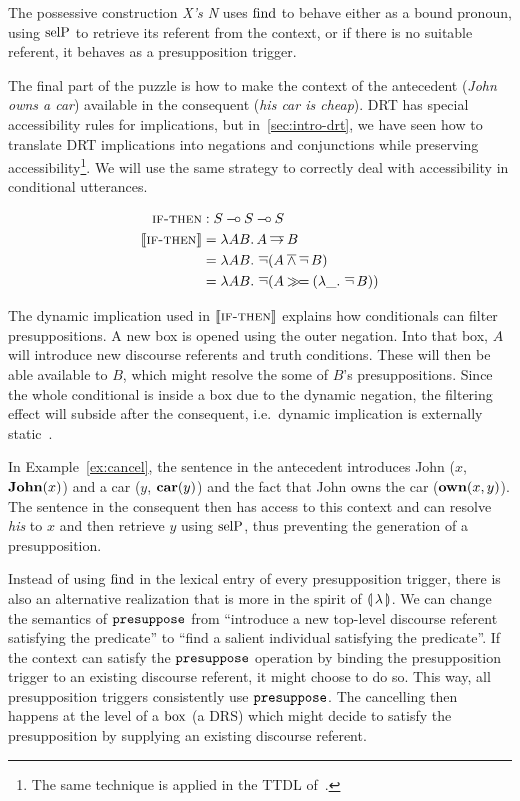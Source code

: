The possessive construction \emph{X's N} uses $\operatorname{find}$ to behave either as a
bound pronoun, using $\operatorname{selP}$ to retrieve its referent from the context, or
if there is no suitable referent, it behaves as a presupposition trigger.

The final part of the puzzle is how to make the context of the antecedent
(\emph{John owns a car}) available in the consequent (\emph{his car is
  cheap}). DRT has special accessibility rules for implications, but
in~\ref{sec:intro-drt}, we have seen how to translate DRT implications into
negations and conjunctions while preserving accessibility\footnote{The same
  technique is applied in the TTDL of~\cite{lebedeva2012expression}.}. We
will use the same strategy to correctly deal with accessibility in
conditional utterances.

\begin{align*}
  \textsc{if-then} &: S \mathbin{{-}\mkern-3.5mu{\circ}} S \mathbin{{-}\mkern-3.5mu{\circ}} S \\
  \llbracket \textsc{if-then} \rrbracket &= \lambda A B.\, A \mathbin{\overline{\to}} B \\
  &= \lambda A B.\, \mathop{\overline{\lnot}} (A \mathbin{\overline{\land}} \mathop{\overline{\lnot}} B) \\
  &= \lambda A B.\, \mathop{\overline{\lnot}} (A \mathbin{\gg\!=} (\lambda \_.\, \mathop{\overline{\lnot}} B))
\end{align*}

The dynamic implication used in $\llbracket \textsc{if-then} \rrbracket$ explains how
conditionals can filter presuppositions. A new box is opened using the
outer negation. Into that box, $A$ will introduce new discourse referents
and truth conditions. These will then be able available to $B$, which might
resolve the some of $B$'s presuppositions. Since the whole conditional is
inside a box due to the dynamic negation, the filtering effect will subside
after the consequent, i.e.\ dynamic implication is externally
static~\cite{groenendijk1991dynamic}.

In Example~\ref{ex:cancel}, the sentence in the antecedent introduces John
($x$, $\textbf{John}(x)$) and a car ($y$, $\textbf{car}(y)$) and the fact that
John owns the car ($\textbf{own}(x, y)$). The sentence in the consequent then
has access to this context and can resolve \emph{his} to $x$ and then
retrieve $y$ using $\operatorname{selP}$, thus preventing the generation of a
presupposition.

Instead of using $\operatorname{find}$ in the lexical entry of every presupposition
trigger, there is also an alternative realization that is more in the
spirit of $\llparenthesis \, \lambda \, \rrparenthesis$. We can change the semantics of
$\mathtt{presuppose}$ from ``introduce a new top-level discourse referent
satisfying the predicate'' to ``find a salient individual satisfying the
predicate''. If the context can satisfy the $\mathtt{presuppose}$ operation by
binding the presupposition trigger to an existing discourse referent, it
might choose to do so. This way, all presupposition triggers consistently
use $\mathtt{presuppose}$. The cancelling then happens at the level of a $\mathrm{box}$
(a DRS) which might decide to satisfy the presupposition by supplying an
existing discourse referent.

